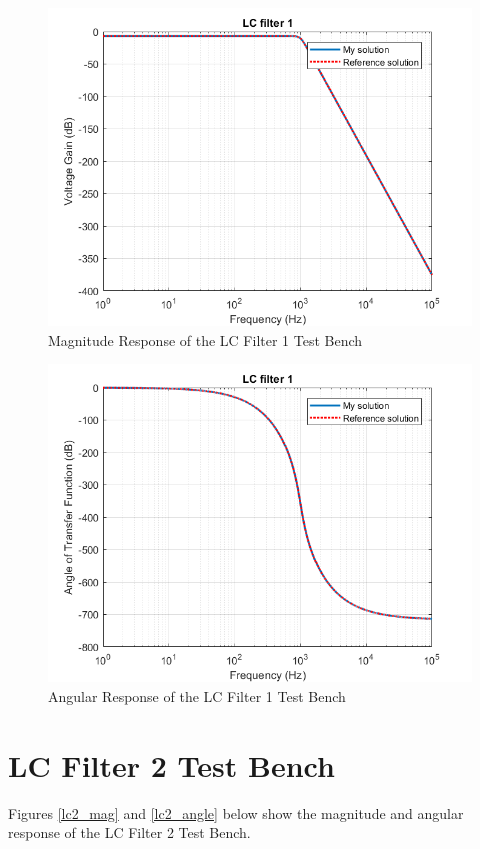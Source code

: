 \documentclass[a4paper,titlepage]{article}
\begin{document}
		\begin{figure}[H]
			\centering
			\includegraphics[width=0.7\linewidth]{../../src/a3/plots/LCFilter1_gain}
			\caption{Magnitude Response of the LC Filter 1 Test Bench}
			\label{lc1_mag}
		\end{figure}
		\begin{figure}[H]
			\centering
			\includegraphics[width=0.7\linewidth]{../../src/a3/plots/LCFilter1_angle}
			\caption{Angular Response of the LC Filter 1 Test Bench}
			\label{lc1_angle}
		\end{figure}
		
		\newpage
		\section{LC Filter 2 Test Bench}
		Figures \ref{lc2_mag} and \ref{lc2_angle} below show the magnitude and angular response of the LC Filter 2 Test Bench. 
		
\end{document}
